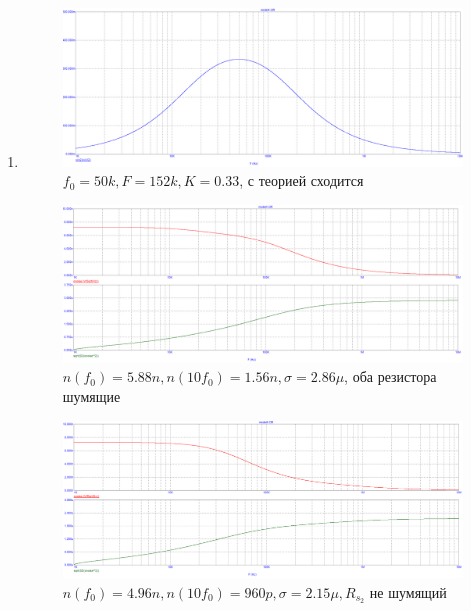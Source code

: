\documentclass[a4paper, 12pt]{article}%
\begin{document}
\begin{enumerate}

\item

\FloatBarrier
\begin{figure}
    \centering
    \includegraphics[scale=0.3]{images/mod4_2_1.png}
    \caption{$f_0 = 50k, F = 152k, K = 0.33$, с теорией сходится}
    \label{fig:m421}
\end{figure}

\begin{figure}
    \centering
    \includegraphics[scale=0.3]{images/mod4_2_2_1.png}
    \caption{$n(f_0) = 5.88n, n(10 f_0) = 1.56n, \sigma = 2.86\mu$, оба резистора шумящие}
    \label{fig:m4221}
\end{figure}

\begin{figure}
    \centering
    \includegraphics[scale=0.3]{images/mod4_2_2_2.png}
    \caption{$n(f_0) = 4.96n, n(10 f_0) = 960p, \sigma = 2.15\mu, R_{s_2}$ не шумящий}
    \label{fig:m4222}
\end{figure}


\end{enumerate}
\end{document}
